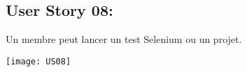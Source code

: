 \newpage{}
\subsection{User Story 08:}
Un membre peut lancer un test Selenium ou un projet.


  \begin{center}
        \texttt{[image: US08]}
  \end{center}